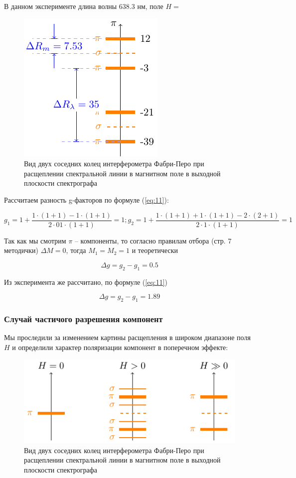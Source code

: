 В данном эксперименте длина волны 638.3 нм, поле $H=$
\begin{figure}[h!]
	\centering
	\includegraphics[scale=1]{ris/4b}
	\caption{Вид двух соседних колец интерферометра Фабри-Перо при расщеплении спектральной линии в магнитном поле в выходной плоскости спектрографа}
	\label{fig:ris4b}
\end{figure}

Рассчитаем разность g-факторов по формуле (\ref{eq:11}):

\begin{equation}
g_{1}=1+\frac{1\cdot(1+1)-1\cdot(1+1)}{2\cdot01\cdot(1+1)}=1; g_{2}=1+\frac{1\cdot(1+1)+1\cdot(1+1)-2\cdot(2+1)}{2\cdot1\cdot(1+1)}=1
\end{equation}

Так как мы смотрим $\pi$ -- компоненты, то согласно правилам отбора (стр. 7 методички) $\Delta M=0$, тогда $M_1=M_2=1$ и теоретически

\begin{equation}
	\Delta g=g_2-g_1=0.5
\end{equation}

Из эксперимента же рассчитано, по формуле (\ref{eq:11})

\begin{equation}
	\Delta g=g_2-g_1=1.89
\end{equation}


\subsubsection{Случай частичого разрешения компонент}

Мы проследили за изменением картины расщепления в широком диапазоне поля $H$ и определили характер поляризации компонент в поперечном эффекте:

\begin{figure}[h!]
	\centering
	\includegraphics[scale=1]{ris/5}
	\caption{Вид двух соседних колец интерферометра Фабри-Перо при расщеплении спектральной линии в магнитном поле в выходной плоскости спектрографа}
	\label{fig:ris5}
\end{figure}
